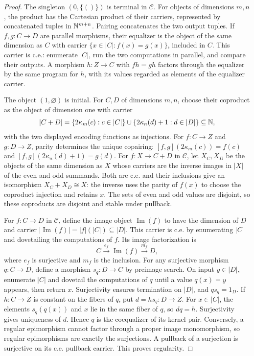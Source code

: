 \begin{proof}
The singleton $(0,\{()\})$ is terminal in $\mathcal C$.
For objects of dimensions $m,n$, the product has the Cartesian product
of their carriers, represented by concatenated tuples in $\mathbb N^{m+n}$.
Pairing concatenates the two output tuples. If $f,g:C\to D$ are
parallel morphisms, their
equalizer is the object of the same dimension as $C$ with carrier
$\{x\in|C|:f(x)=g(x)\}$, included in $C$. This carrier is c.e.:
enumerate $|C|$, run the two computations in parallel, and compare
their outputs. A morphism $h:Z\to C$
with $fh=gh$ factors through the equalizer by the same program for $h$,
with its values regarded as elements of the equalizer carrier.

The object $(1,\varnothing)$ is initial. For $C,D$ of dimensions $m,n$, choose
their coproduct as the object of dimension one with carrier
\[
 |C+D|=\{2\kappa_m(c):c\in|C|\}
        \cup\{2\kappa_n(d)+1:d\in|D|\}\subseteq\mathbb N,
\]
with the two displayed encoding functions as injections.
For $f:C\to Z$ and $g:D\to Z$, parity determines the unique
copairing: $[f,g](2\kappa_m(c))=f(c)$ and
$[f,g](2\kappa_n(d)+1)=g(d)$.
For $f:X\to C+D$ in $\mathcal C$, let $X_C,X_D$ be the
objects of the same dimension as $X$ whose carriers are the
inverse images in $|X|$ of the even and odd summands. Both are c.e.
and their inclusions give an isomorphism $X_C+X_D\cong X$:
the inverse uses the parity of $f(x)$ to choose the coproduct injection
and retains $x$. The sets of even and odd values are disjoint, so these coproducts are disjoint and
stable under pullback.

For $f:C\to D$ in $\mathcal C$, define the image object
$\operatorname{Im}(f)$ to have the dimension of $D$ and carrier
$|\operatorname{Im}(f)|=|f|(|C|)\subseteq|D|$. This carrier is
c.e. by enumerating $|C|$ and dovetailing the computations of $f$. Its image factorization
is
\[
 C\xrightarrow{e_f}\operatorname{Im}(f)
       \xrightarrow{m_f}D,
\]
where $e_f$ is surjective and $m_f$ is the inclusion.
For any surjective morphism $q:C\to D$, define a morphism
$s_q:D\to C$ by preimage search. On input $y\in|D|$, enumerate
$|C|$ and dovetail the computations of $q$ until a value
$q(x)=y$ appears, then return $x$. Surjectivity ensures termination
on $|D|$, and $qs_q=1_D$.
If $h:C\to Z$ is constant on the fibers of $q$, put
$d=hs_q:D\to Z$. For $x\in|C|$, the elements $s_q(q(x))$ and
$x$ lie in the same fiber of $q$, so $dq=h$. Surjectivity gives
uniqueness of $d$. Hence $q$ is the coequalizer of its kernel pair.
Conversely, a regular epimorphism
cannot factor through a proper image monomorphism, so regular
epimorphisms are exactly the surjections. A pullback of a surjection
is surjective on its c.e. pullback carrier. This proves regularity.


\end{proof}
